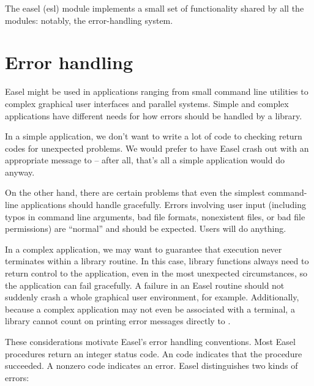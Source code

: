 The easel (esl) module implements a small set of functionality shared
by all the modules: notably, the error-handling system.

\section{Error handling}

Easel might be used in applications ranging from small command line
utilities to complex graphical user interfaces and parallel
systems. Simple and complex applications have different needs for how
errors should be handled by a library.

In a simple application, we don't want to write a lot of code to
checking return codes for unexpected problems. We would prefer to have
Easel crash out with an appropriate message to  -- after
all, that's all a simple application would do anyway.

On the other hand, there are certain problems that even the simplest
command-line applications should handle gracefully. Errors involving
user input (including typos in command line arguments, bad file
formats, nonexistent files, or bad file permissions) are ``normal''
and should be expected. Users will do anything.

In a complex application, we may want to guarantee that execution
never terminates within a library routine. In this case, library
functions always need to return control to the application, even in
the most unexpected circumstances, so the application can fail
gracefully. A failure in an Easel routine should not suddenly crash a
whole graphical user environment, for example. Additionally, because a
complex application may not even be associated with a terminal, a
library cannot count on printing error messages directly to
.

These considerations motivate Easel's error handling conventions.
Most Easel procedures return an integer status code. An 
code indicates that the procedure succeeded. A nonzero code indicates
an error. Easel distinguishes two kinds of errors:

